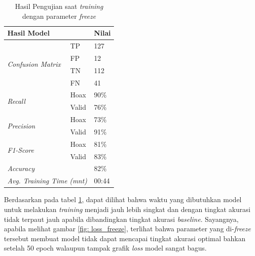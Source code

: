 \begin{table}[h]
    \caption{Hasil Pengujian saat \textit{training} dengan parameter \textit{freeze}}
    \label{tab: loss_freeze}
    \centering
    \begin{tabular}{|l|l|l|}
        \hline
        \multicolumn{2}{|l|}{\textbf{Hasil Model}}              & \textbf{Nilai}        \\ \hline
        \multirow{4}{*}{\textit{Confusion Matrix}}              & TP             & 127  \\ \cline{2-3}
                                                                & FP             & 12   \\ \cline{2-3}
                                                                & TN             & 112  \\ \cline{2-3}
                                                                & FN             & 41   \\ \hline
        \multirow{2}{*}{\textit{Recall}}                        & Hoax           & 90\% \\ \cline{2-3}
                                                                & Valid          & 76\% \\ \hline
        \multirow{2}{*}{\textit{Precision}}                     & Hoax           & 73\% \\ \cline{2-3}
                                                                & Valid          & 91\% \\ \hline
        \multirow{2}{*}{\textit{F1-Score}}                      & Hoax           & 81\% \\ \cline{2-3}
                                                                & Valid          & 83\% \\ \hline
        \multicolumn{2}{|l|}{\textit{Accuracy}}                 & 82\%                  \\ \hline
        \multicolumn{2}{|l|}{\textit{Avg. Training Time (mnt)}} & 00:44                 \\ \hline
    \end{tabular}
\end{table}

Berdasarkan pada tabel \ref{tab: loss_freeze}, dapat dilihat bahwa waktu yang dibutuhkan model untuk melakukan \textit{training} menjadi jauh lebih singkat dan dengan tingkat akurasi tidak terpaut jauh apabila dibandingkan tingkat akurasi \textit{baseline}. Sayangnya, apabila melihat gambar \ref{fig: loss_freeze}, terlihat bahwa parameter yang di-\textit{freeze} tersebut membuat model tidak dapat mencapai tingkat akurasi optimal bahkan setelah 50 epoch walaupun tampak grafik \textit{loss} model sangat bagus.
